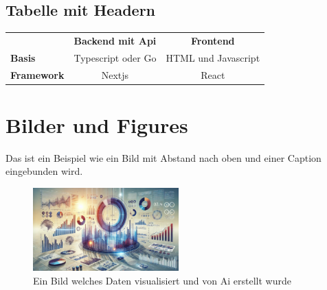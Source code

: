 \documentclass{article}
\begin{document}
\subsection{Tabelle mit Headern}
\begin{tabular}{|l|c|c|}
  \hline
  \rowcolor{gray!20} & \textbf{Backend mit Api} & \textbf{Frontend} \\
  \cellcolor{gray!20} \textbf{Basis} & \cellcolor{blue!20} Typescript oder Go & \cellcolor{orange!20}HTML und Javascript \\
  \cellcolor{gray!20} \textbf{Framework} & \cellcolor{blue!20} Nextjs & \cellcolor{orange!20} React \\
  \hline
\end{tabular}

\section{Bilder und Figures}
Das ist ein Beispiel wie ein Bild mit Abstand nach oben und einer Caption eingebunden wird.

\vspace{1cm}
\begin{figure}[h]
  \centering
  \includegraphics[width=0.5\textwidth]{bild.jpg}
  \caption{Ein Bild welches Daten visualisiert und von Ai erstellt wurde}
\end{figure}
\end{document}
